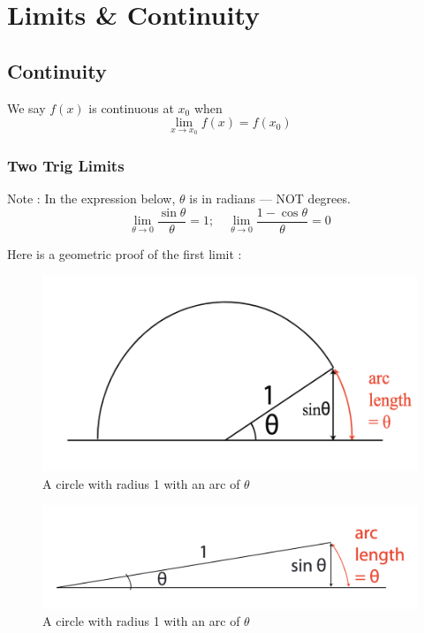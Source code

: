 

\chapter{Limits \& Continuity}

\bigbreak
\section{Continuity}

We say $f(x)$ is continuous at $x_0$ when $$\lim_{x \to x_0} f(x) = f(x_0)$$

\subsection*{Two Trig Limits}

Note : In the expression below, $\theta$ is in radians --- NOT degrees.
$$ \boxed{	\lim_{\theta \to 0} \frac{\sin \theta}{\theta} = 1; \quad \lim_{\theta \to 0} \frac{1-\cos \theta}{\theta} = 0 } $$

Here is a geometric proof of the first limit :

\begin{figure}[ht!]
	\centering
	\includegraphics[scale=0.7]{./images/lecture_2_figure_1.png}
	\caption{A circle with radius 1 with an arc of $\theta$}
\end{figure}

\begin{figure}[ht!]
	\centering
	\includegraphics[scale=0.5]{./images/lecture_2_figure_2.png}
	\caption{A circle with radius 1 with an arc of $\theta$}
\end{figure}

